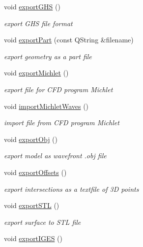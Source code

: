 \begin{DoxyCompactItemize}
void \hyperlink{classShipCAD_1_1Controller_a00b524f96361a01e0241ffc2b23c60cc}{export\+G\+HS} ()
\begin{DoxyCompactList}\small\item\em export G\+HS file format \end{DoxyCompactList}\item 
void \hyperlink{classShipCAD_1_1Controller_a7b9dba5b5e8ba7f761b0223ff3629e9c}{export\+Part} (const Q\+String \&filename)
\begin{DoxyCompactList}\small\item\em export geometry as a part file \end{DoxyCompactList}\item 
void \hyperlink{classShipCAD_1_1Controller_af86e9dc7208c8ffcacfae13ce3eae2c8}{export\+Michlet} ()
\begin{DoxyCompactList}\small\item\em export file for C\+FD program Michlet \end{DoxyCompactList}\item 
void \hyperlink{classShipCAD_1_1Controller_a9f2572c18a3e6adee8b36d65d0f4d0e8}{import\+Michlet\+Waves} ()
\begin{DoxyCompactList}\small\item\em import file from C\+FD program Michlet \end{DoxyCompactList}\item 
void \hyperlink{classShipCAD_1_1Controller_aedec5d6b6975369449ad85015fdf356b}{export\+Obj} ()
\begin{DoxyCompactList}\small\item\em export model as wavefront .obj file \end{DoxyCompactList}\item 
void \hyperlink{classShipCAD_1_1Controller_aaa421c35fc4e7b567123810ac7982747}{export\+Offsets} ()
\begin{DoxyCompactList}\small\item\em export intersections as a textfile of 3D points \end{DoxyCompactList}\item 
void \hyperlink{classShipCAD_1_1Controller_a11a8473f84eeed35f9f48c119da16351}{export\+S\+TL} ()
\begin{DoxyCompactList}\small\item\em export surface to S\+TL file \end{DoxyCompactList}\item 
void \hyperlink{classShipCAD_1_1Controller_aff36c67432f7527fccad4b0b90c226a9}{export\+I\+G\+ES} ()

\end{DoxyCompactItemize}
